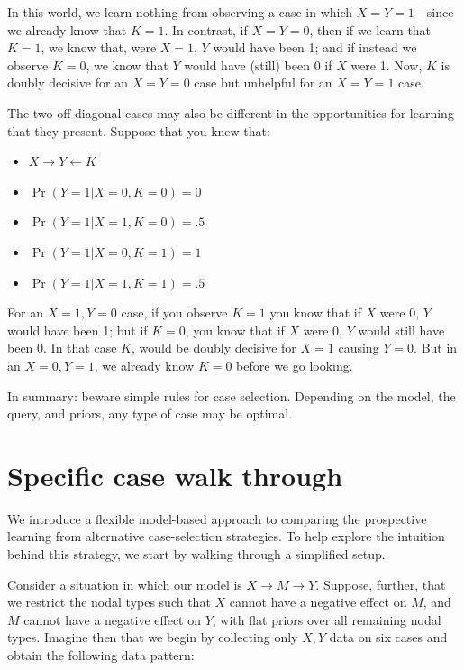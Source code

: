 \documentclass[
  12pt,
]{book}
\providecommand{\tightlist}{%
  \setlength{\itemsep}{0pt}\setlength{\parskip}{0pt}}
\begin{document}
In this world, we learn nothing from observing a case in which \(X=Y=1\)---since we already know that \(K=1\). In contrast, if \(X=Y=0\), then if we learn that \(K=1\), we know that, were \(X=1\), \(Y\) would have been 1; and if instead we observe \(K=0\), we know that \(Y\) would have (still) been 0 if \(X\) were 1. Now, \(K\) is doubly decisive for an \(X=Y=0\) case but unhelpful for an \(X=Y=1\) case.

The two off-diagonal cases may also be different in the opportunities for learning that they present. Suppose that you knew that:

\begin{itemize}
\tightlist
\item
  \(X \rightarrow Y \leftarrow K\)
\item
  \(\Pr(Y=1|X=0, K = 0) = 0\)
\item
  \(\Pr(Y=1|X=1, K = 0) = .5\)
\item
  \(\Pr(Y=1|X=0, K = 1) = 1\)
\item
  \(\Pr(Y=1|X=1, K = 1) = .5\)
\end{itemize}

For an \(X=1, Y=0\) case, if you observe \(K=1\) you know that if \(X\) were 0, \(Y\) would have been 1; but if \(K=0\), you know that if \(X\) were 0, \(Y\) would still have been 0. In that case \(K\), would be doubly decisive for \(X=1\) causing \(Y=0\). But in an \(X=0, Y=1\), we already know \(K=0\) before we go looking.

In summary: beware simple rules for case selection. Depending on the model, the query, and priors, any type of case may be optimal.

\hypertarget{specific-case-walk-through}{%
\section{Specific case walk through}\label{specific-case-walk-through}}

We introduce a flexible model-based approach to comparing the prospective learning from alternative case-selection strategies. To help explore the intuition behind this strategy, we start by walking through a simplified setup.

Consider a situation in which our model is \(X \rightarrow M \rightarrow Y\). Suppose, further, that we restrict the nodal types such that \(X\) cannot have a negative effect on \(M\), and \(M\) cannot have a negative effect on \(Y\), with flat priors over all remaining nodal types. Imagine then that we begin by collecting only \(X,Y\) data on six cases and obtain the following data pattern:
\end{document}
